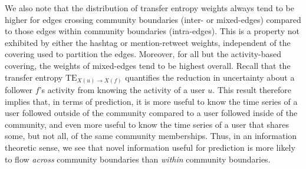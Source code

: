 We also note that the distribution of transfer entropy weights always tend to be higher for edges crossing community boundaries (inter- or mixed-edges) compared to those edges within community boundaries (intra-edges). This is a property not exhibited by either the hashtag or mention-retweet weights, independent of the covering used to partition the edges. Moreover, for all but the activity-based covering, the weights of mixed-edges tend to be highest overall.  Recall that the transfer entropy $\text{TE}_{X(u) \to X(f)}$ quantifies the reduction in uncertainty about a follower $f$'s activity from knowing the activity of a user $u$. This result therefore implies that, in terms of prediction, it is more useful to know the time series of a user followed outside of the community compared to a user followed inside of the community, and even more useful to know the time series of a user that shares some, but not all, of the same community memberships. Thus, in an information theoretic sense, we see that novel information useful for prediction is more likely to flow \emph{across} community boundaries than \emph{within} community boundaries.

